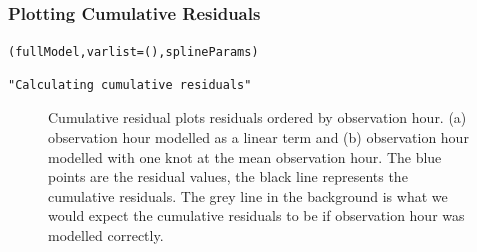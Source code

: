 \begin{frame}[fragile]
\frametitle{Plotting Cumulative Residuals}
\begin{knitrout}\footnotesize
{}\color{fgcolor}\begin{kframe}
\begin{alltt}
(fullModel, varlist= (), splineParams)
\end{alltt}
\begin{verbatim}
"Calculating cumulative residuals"
\end{verbatim}
\end{kframe}
\end{knitrout}

\begin{figure}[h]
  \centering
  \hfill
\caption{Cumulative residual plots residuals ordered by observation hour. (a) observation hour modelled as a linear term and (b) observation hour modelled with one knot at the mean observation hour.  The blue points are the residual values, the black line represents the cumulative residuals. The grey line in the background is what we would expect the cumulative residuals to be if observation hour was modelled correctly.}
\label{fig:nscumres1}
\end{figure}
\end{frame}

